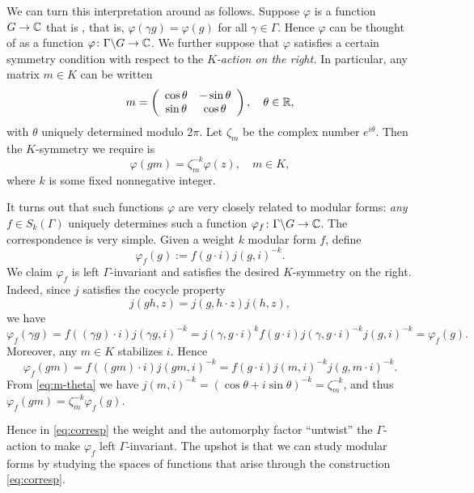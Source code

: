 We can turn this interpretation around as follows.  Suppose
$\varphi$ is a function $G\rightarrow \mathbb{C}$ that is , that is, $\varphi (\gamma g) = \varphi (g)$
for all $\gamma \in \Gamma$.  Hence $\varphi$ can be thought of as a
function $\varphi \colon \Gamma \backslash G\rightarrow \mathbb{C}$.  We
further suppose that $\varphi$ satisfies a certain symmetry condition
with respect to the \emph{$K$-action on the right.}  In particular,
any matrix $m\in K$ can be written 
\begin{equation}\label{eq:m-theta}
m = \left(\begin{array}{cc}
\cos \theta & -\sin \theta \\
\sin \theta & \cos \theta \\
\end{array} \right), \quad \theta \in \mathbb{R} ,
\end{equation}
with $\theta$ uniquely determined modulo $2\pi$.  Let $\zeta_{m}$ be
the complex number $e^{i\theta}$.  Then the $K$-symmetry we require is 
\[
\varphi (gm) = \zeta_{m}^{-k}\varphi(z), \quad m\in K,
\]
where $k$ is some fixed nonnegative integer.

It turns out that such functions $\varphi$ are very closely related to
modular forms: \emph{any} $f\in S_{k} (\Gamma)$ uniquely determines such a
function $\varphi_{f} \colon \Gamma \backslash G \rightarrow \mathbb{C}$.  The
correspondence is very simple.  Given a weight $k$ modular form $f$, define
\begin{equation}\label{eq:corresp}
\varphi_{f} (g) := f (g\cdot i)j (g,i)^{-k}.
\end{equation}
We claim $\varphi_{f}$ is left $\Gamma$-invariant and satisfies the 
desired $K$-symmetry on the right.
Indeed, since $j$ satisfies the
cocycle property $$j (gh, z) = j (g,h\cdot z)j (h,z),$$ we have 
\[
\varphi_{f} (\gamma g) = f
((\gamma g)\cdot i)j (\gamma g,i)^{-k} = j (\gamma ,g\cdot i)^{k}f (g\cdot
i)j (\gamma ,g\cdot i)^{-k}j (g,i)^{-k} = \varphi_{f} (g).
\]
Moreover, any
$m\in K$ stabilizes $i$.  Hence 
\[
\varphi_{f} (gm) = f ((gm)\cdot i) j
(gm,i)^{-k} = f (g\cdot i) j (m,i)^{-k}j (g,m\cdot i)^{-k}.
\]
From
\eqref{eq:m-theta} we have $j (m,i)^{-k} = (\cos \theta + i\sin
\theta)^{-k} = \zeta_{m}^{-k}$, and thus $\varphi_{f} (gm) =
 \zeta^{-k}_{m}\varphi_{f} (g)$.

Hence in \eqref{eq:corresp} the weight and the automorphy factor
``untwist'' the $\Gamma$-action to make $\varphi_{f}$ left
$\Gamma$-invariant.  The upshot is that we can study modular forms by
studying the spaces of functions that arise through the construction
\eqref{eq:corresp}.

